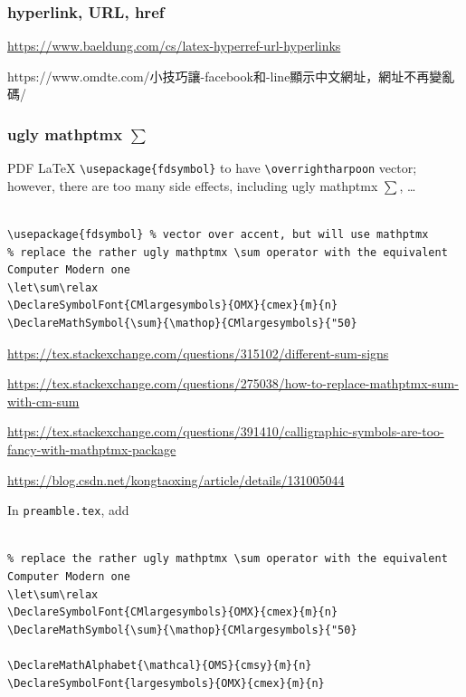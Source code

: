 \documentclass[
]{book}
\theoremstyle{definition}
\theoremstyle{definition}
\theoremstyle{definition}
\theoremstyle{definition}
\theoremstyle{remark}
\begin{document}
\hypertarget{hyperlink-url-href}{%
\subsubsection{hyperlink, URL, href}\label{hyperlink-url-href}}

\url{https://www.baeldung.com/cs/latex-hyperref-url-hyperlinks}

\begin{CJK}{UTF8}{bsmi}
https://www.omdte.com/小技巧讓-facebook和-line顯示中文網址，網址不再變亂碼/
\end{CJK}

\hypertarget{ugly-mathptmx-sum}{%
\subsubsection{\texorpdfstring{ugly mathptmx \(\sum\)}{ugly mathptmx \textbackslash sum}}\label{ugly-mathptmx-sum}}

PDF LaTeX \texttt{\textbackslash{}usepackage\{fdsymbol\}} to have \texttt{\textbackslash{}overrightharpoon} vector; however, there are too many side effects, including ugly mathptmx \(\sum\), \ldots{}

\begin{verbatim}

\usepackage{fdsymbol} % vector over accent, but will use mathptmx
% replace the rather ugly mathptmx \sum operator with the equivalent Computer Modern one
\let\sum\relax
\DeclareSymbolFont{CMlargesymbols}{OMX}{cmex}{m}{n}
\DeclareMathSymbol{\sum}{\mathop}{CMlargesymbols}{"50}
\end{verbatim}

\url{https://tex.stackexchange.com/questions/315102/different-sum-signs}

\url{https://tex.stackexchange.com/questions/275038/how-to-replace-mathptmx-sum-with-cm-sum}

\url{https://tex.stackexchange.com/questions/391410/calligraphic-symbols-are-too-fancy-with-mathptmx-package}

\url{https://blog.csdn.net/kongtaoxing/article/details/131005044}

In \texttt{preamble.tex}, add

\begin{verbatim}

% replace the rather ugly mathptmx \sum operator with the equivalent Computer Modern one
\let\sum\relax
\DeclareSymbolFont{CMlargesymbols}{OMX}{cmex}{m}{n}
\DeclareMathSymbol{\sum}{\mathop}{CMlargesymbols}{"50}

\DeclareMathAlphabet{\mathcal}{OMS}{cmsy}{m}{n}
\DeclareSymbolFont{largesymbols}{OMX}{cmex}{m}{n}
\end{verbatim}
\end{document}
